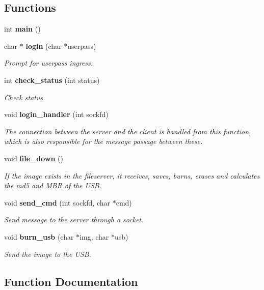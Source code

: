 \subsection*{Functions}
\begin{DoxyCompactItemize}
\item 
int \textbf{ main} ()
\item 
char $\ast$ \textbf{ login} (char $\ast$userpass)
\begin{DoxyCompactList}\small\item\em Prompt for userpass ingress. \end{DoxyCompactList}\item 
int \textbf{ check\+\_\+status} (int status)
\begin{DoxyCompactList}\small\item\em Check status. \end{DoxyCompactList}\item 
void \textbf{ login\+\_\+handler} (int sockfd)
\begin{DoxyCompactList}\small\item\em The connection between the server and the client is handled from this function, which is also responsible for the message passage between these. \end{DoxyCompactList}\item 
void \textbf{ file\+\_\+down} ()
\begin{DoxyCompactList}\small\item\em If the image exists in the fileserver, it receives, saves, burns, erases and calculates the md5 and M\+BR of the U\+SB. \end{DoxyCompactList}\item 
void \textbf{ send\+\_\+cmd} (int sockfd, char $\ast$cmd)
\begin{DoxyCompactList}\small\item\em Send message to the server through a socket. \end{DoxyCompactList}\item 
void \textbf{ burn\+\_\+usb} (char $\ast$img, char $\ast$usb)
\begin{DoxyCompactList}\small\item\em Send the image to the U\+SB. \end{DoxyCompactList}\end{DoxyCompactItemize}


\subsection{Function Documentation}
\mbox{\label{client_8c_aa2b1932ee1ab021c4d5cef8b93a56445}} 
